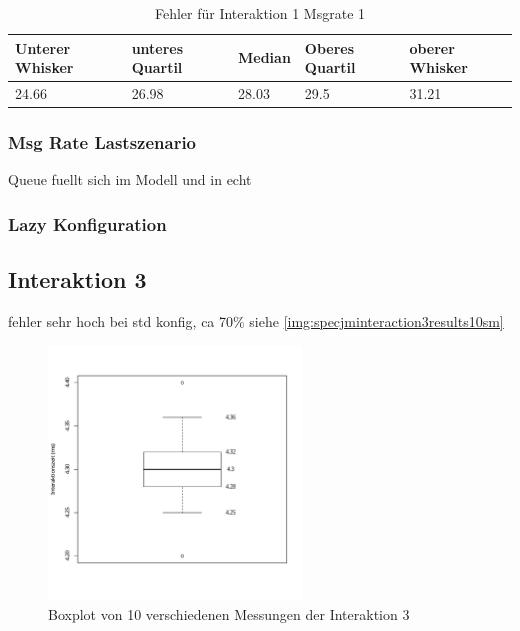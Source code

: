 
\begin{table}
  \begin{tabular}{|l|l|l|l|l|}
    Unterer Whisker & unteres Quartil & Median & Oberes Quartil & oberer Whisker \\
    \hline
    24.66 & 26.98 & 28.03 & 29.5 & 31.21
  \end{tabular}
	\caption{\label{tab:interaction1msgrate1error} Fehler für Interaktion 1 Msgrate 1}
\end{table}
\subsubsection{Msg Rate Lastszenario}
Queue fuellt sich im Modell und in echt
\subsubsection{Lazy Konfiguration}

\subsection{Interaktion 3}
fehler sehr hoch bei std konfig, ca 70\% siehe \autoref{img:specjminteraction3results10sm} \\

\begin{figure}
\center
  \includegraphics[width=0.6\textwidth]{images/evaluation/specjmsresults/interaktion3-10SM.pdf}
  \caption{Boxplot von 10 verschiedenen Messungen der Interaktion 3}
  \label{img:specjminteraction3results10sm}
\end{figure}

